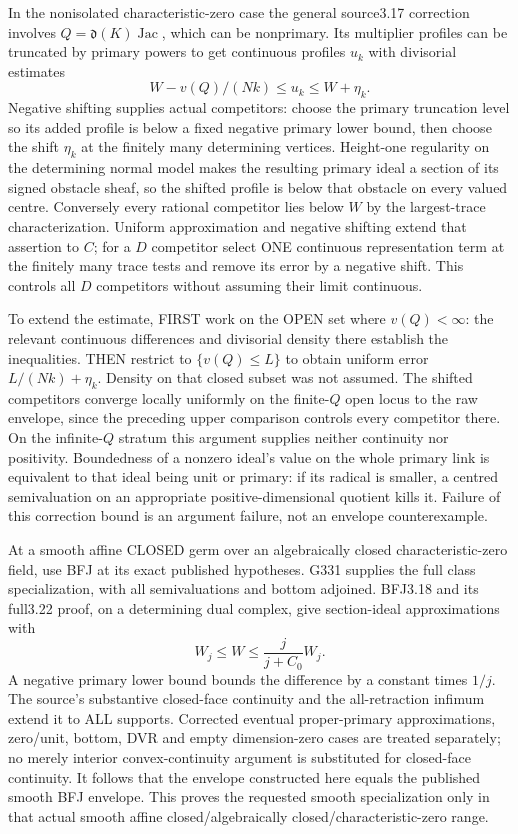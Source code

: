 \documentclass[11pt]{article}
\begin{document}
In the nonisolated characteristic-zero case the general source3.17 correction involves \(Q=\mathfrak d(K)\operatorname{Jac}\), which can be nonprimary. Its multiplier profiles can be truncated by primary powers to get continuous profiles \(u_k\) with divisorial estimates
\[
W-v(Q)/(Nk)\le u_k\le W+\eta_k.
\]
Negative shifting supplies actual competitors: choose the primary truncation level so its added profile is below a fixed negative primary lower bound, then choose the shift \(\eta_k\) at the finitely many determining vertices. Height-one regularity on the determining normal model makes the resulting primary ideal a section of its signed obstacle sheaf, so the shifted profile is below that obstacle on every valued centre. Conversely every rational competitor lies below \(W\) by the largest-trace characterization. Uniform approximation and negative shifting extend that assertion to \(C\); for a \(D\) competitor select ONE continuous representation term at the finitely many trace tests and remove its error by a negative shift. This controls all \(D\) competitors without assuming their limit continuous.

To extend the estimate, FIRST work on the OPEN set where \(v(Q)<\infty\): the relevant continuous differences and divisorial density there establish the inequalities. THEN restrict to \(\{v(Q)\le L\}\) to obtain uniform error \(L/(Nk)+\eta_k\). Density on that closed subset was not assumed. The shifted competitors converge locally uniformly on the finite-\(Q\) open locus to the raw envelope, since the preceding upper comparison controls every competitor there. On the infinite-\(Q\) stratum this argument supplies neither continuity nor positivity. Boundedness of a nonzero ideal's value on the whole primary link is equivalent to that ideal being unit or primary: if its radical is smaller, a centred semivaluation on an appropriate positive-dimensional quotient kills it. Failure of this correction bound is an argument failure, not an envelope counterexample.

At a smooth affine CLOSED germ over an algebraically closed characteristic-zero field, use BFJ at its exact published hypotheses. G331 supplies the full class specialization, with all semivaluations and bottom adjoined. BFJ3.18 and its full3.22 proof, on a determining dual complex, give section-ideal approximations with
\[
W_j\le W\le \frac{j}{j+C_0}W_j.
\]
A negative primary lower bound bounds the difference by a constant times \(1/j\). The source's substantive closed-face continuity and the all-retraction infimum extend it to ALL supports. Corrected eventual proper-primary approximations, zero/unit, bottom, DVR and empty dimension-zero cases are treated separately; no merely interior convex-continuity argument is substituted for closed-face continuity. It follows that the envelope constructed here equals the published smooth BFJ envelope. This proves the requested smooth specialization only in that actual smooth affine closed/algebraically closed/characteristic-zero range.
\end{document}
